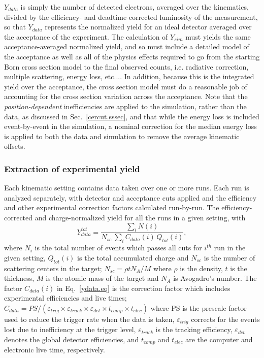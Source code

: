 $Y_{data}$ is simply the number of detected electrons, averaged over the
kinematics, divided by the efficiency- and deadtime-corrected luminosity of the
measurement, so that $Y_{data}$ represents the normalized yield for an ideal
detector averaged over the acceptance of the experiment. The calculation of
$Y_{sim}$ must yields the same acceptance-averaged normalized yield,
and so must include a detailed model of the acceptance as well as all of the
physics effects required to go from the starting Born cross section model to
the final observed counts, i.e. radiative correction, multiple scattering,
energy loss, etc.... In addition, because this is the integrated yield over
the acceptance, the cross section model must do a reasonable job of accounting
for the cross section variation across the acceptance. Note that the
\textit{position-dependent} inefficiencies are applied to the simulation,
rather than the data, as discussed in Sec.~\ref{cercut.sssec}, and that
while the energy loss is included event-by-event in the simulation, a nominal
correction for the median energy loss is applied to both the data and
simulation to remove the average kinematic offsets.



\subsubsection{Extraction of experimental yield}\label{datayield.sssec}

Each kinematic setting contains data taken over one or more runs. Each run is
analyzed separately, with detector and acceptance cuts applied and the
efficiency and other experimental correction factors calculated run-by-run.
The efficiency-corrected and charge-normalized yield for all the runs in a
given setting, with
%
\begin{equation}\label{ydata.eq}
Y^{tot}_{data}=\frac{\sum_i N(i)}{N_{sc}~\sum_i C_{data}(i) \,Q_{tot}(i) },
\end{equation}
%
where $N_i$ is the total number of events which passes all cuts for $i^{th}$
run in the given setting, $Q_{tot}(i)$ is the total accumulated charge and
$N_{sc}$ is the number of scattering centers in the target; $N_{sc}=\rho t
N_A/M$ where $\rho$ is the density, $t$ is the thickness, $M$ is the atomic
mass of the target and $N_A$ is Avogadro's number. The factor $C_{data}(i) $
in Eq.~\ref{ydata.eq} is the correction factor which includes experimental
efficiencies and live times; $C_{data} = PS/(\varepsilon_{trig} \times
\varepsilon_{track} \times \varepsilon_{det} \times t_{comp} \times t_{elec})$
where PS is the prescale factor used to reduce the trigger rate when the data
is taken, $\varepsilon_{trig}$ corrects for the events lost due to
inefficiency at the trigger level, $\varepsilon_{track}$ is the tracking
efficiency, $\varepsilon_{det}$ denotes the global detector efficiencies, and
$t_{comp}$ and $ t_{elec}$ are the computer and electronic live time,
respectively.

